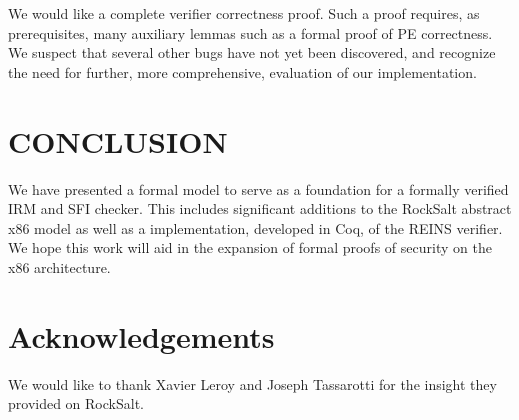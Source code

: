 \documentclass[conference]{IEEEtran}
\begin{document}
We would like a complete verifier correctness proof.
Such a proof requires, as prerequisites, many auxiliary lemmas such as a formal proof of PE correctness.   
We suspect that several other bugs have not yet been discovered, and recognize the need for further, more comprehensive, evaluation of our implementation.

\section{ CONCLUSION}

We have presented a formal model to serve as a foundation for a formally verified IRM and SFI checker. 
This includes significant additions to the RockSalt abstract x86 model as well as a implementation, developed in Coq, of the REINS verifier.
We hope this work will aid in the expansion of formal proofs of security on the x86 architecture.  

\section*{Acknowledgements}
We would like to thank Xavier Leroy \cite{Leroy:Misc} and Joseph Tassarotti \cite{Tassarotti:Misc} for the insight they provided on RockSalt.  

\nocite {*}



\end{document}
